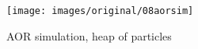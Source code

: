 \begin{figure}[!htb] 
\centering 
\texttt{[image: images/original/08aorsim]} 
\caption{AOR simulation, heap of particles}
\label{fig:08aorsim} 
\end{figure}


